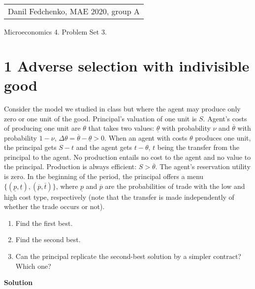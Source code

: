 \documentclass[a4paper]{article}
\begin{document}
	\begin{flushright}
	\begin{tabular}{r}
		Danil Fedchenko, MAE 2020, group A \\
	\end{tabular}
\end{flushright}


\begin{center}
	Microeconomics 4. Problem Set 3.
\end{center}
\section*{1 Adverse selection with indivisible good}
	Consider the model we studied in class but where the agent may produce only zero or
	one unit of the good. Principal's valuation of one unit is $S$. Agent's costs of producing
	one unit are $\theta$ that takes two values: $\underline{\theta}$ with probability $\nu$ and $\overline{\theta}$ with probability $1-\nu$,
	$\Delta \theta = \overline{\theta} - \underline{\theta} > 0$. When an agent with costs $\theta$ produces one unit, the principal gets $S-t$ and the agent gets $t - \theta$, $t$ being the transfer from the principal to the agent. No production entails no cost to the agent and no value to the principal. Production is always efficient:
	$S > \overline{\theta}$. The agent's reservation utility is zero.
	In the beginning of the period, the principal offers a menu $\{(\underline{p}, \underline{t}), (\overline{p}, \overline{t})\}$, where $\underline{p}$ and $\overline{p}$ are the probabilities of trade with the low and high cost type, respectively (note
	that the transfer is made independently of whether the trade occurs or not).
\begin{enumerate}
	\item Find the first best.
	\item Find the second best.
	\item Can the principal replicate the second-best solution by a simpler contract? Which
one?
\end{enumerate}


\textbf{Solution}
\end{document}
